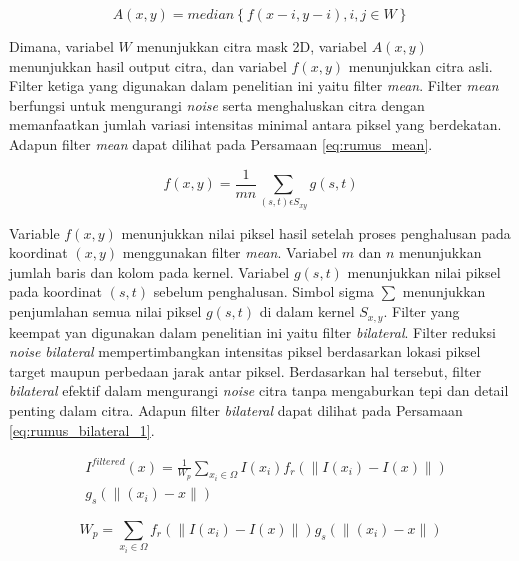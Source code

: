 {\begin{equation}
	A(x,y) = median\left\{ f\left( x - i, y - i \right),i,j\in W  \right\}
	\label{eq:rumus_median}
\end{equation}

Dimana, variabel $W$ menunjukkan citra mask 2D, variabel $A(x,y)$ menunjukkan hasil output citra, dan variabel $f(x,y)$ menunjukkan citra asli. Filter ketiga yang digunakan dalam penelitian ini yaitu filter \textit{mean}. Filter \textit{mean} berfungsi untuk mengurangi \textit{noise} serta menghaluskan citra dengan memanfaatkan jumlah variasi intensitas minimal antara piksel yang berdekatan. Adapun filter \textit{mean} dapat dilihat pada Persamaan \ref{eq:rumus_mean}.

\begin{equation}
	f(x,y) = \frac{1}{mn}\sum_{(s,t)\epsilon S_{xy}}g(s,t)
	\label{eq:rumus_mean}
\end{equation}

Variable $f(x,y)$ menunjukkan nilai piksel hasil setelah proses penghalusan pada koordinat $(x,y)$ menggunakan filter \textit{mean}. Variabel $m$ dan $n$ menunjukkan jumlah baris dan kolom pada kernel. Variabel $g(s,t)$ menunjukkan nilai piksel pada koordinat $(s,t)$ sebelum penghalusan. Simbol sigma $\sum$ menunjukkan penjumlahan semua nilai piksel $g(s,t)$ di dalam kernel $S_{x,y}$. Filter yang keempat yan digunakan dalam penelitian ini yaitu filter \textit{bilateral}. Filter reduksi \textit{noise} \textit{bilateral} mempertimbangkan intensitas piksel berdasarkan lokasi piksel target maupun perbedaan jarak antar piksel. Berdasarkan hal tersebut, filter \textit{bilateral} efektif dalam mengurangi \textit{noise} citra tanpa mengaburkan tepi dan detail penting dalam citra. Adapun filter \textit{bilateral} dapat dilihat pada Persamaan \ref{eq:rumus_bilateral_1}. 


\begin{equation}\label{eq:rumus_bilateral_1}
	\begin{split}
		&I^{filtered}(x) = \frac{1}{W_p}\sum_{x_i\in\Omega}I\left(x_i\right)f_r(\parallel I\left(x_i\right) - I\left(x\right)\parallel)\\&g_s(\parallel \left(x_i\right)-x \parallel)
	\end{split}
\end{equation}


\begin{equation}
	{W_p}=\sum_{x_i\in\Omega}f_r(\parallel I\left(x_i\right) - I\left(x\right)\parallel)g_s(\parallel \left(x_i\right)-x \parallel)
	\label{eq:rumus_bilateral_2}
\end{equation}

}
